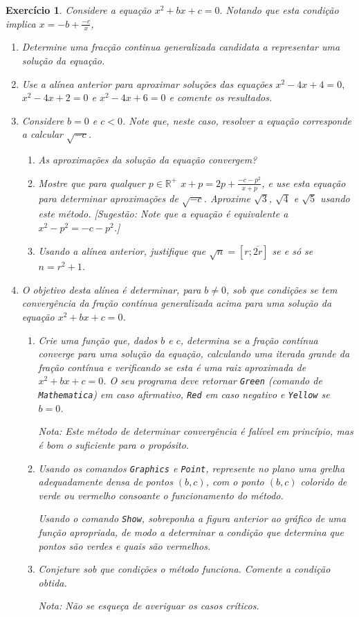 \documentclass{article}
\newtheorem{ex}{Exercício}[section]
\begin{document}
\begin{ex}
Considere a equação $x^2+bx+c=0.$ Notando que esta condição implica $x=-b+\frac{-c}{x}$,
\begin{enumerate}
    \item Determine uma fracção continua generalizada candidata a representar uma solução da equação.
    \item Use a alínea anterior para aproximar soluções das equações $x^2-4x+4=0,$ $x^2-4x+2=0$ e $x^2-4x+6=0$ e comente os resultados.
    \item Considere $b=0$ e $c<0$. Note que, neste caso, resolver a equação corresponde a calcular $\sqrt{-c}$.
    \begin{enumerate}
        \item As aproximações da solução da equação convergem?
        \item Mostre que para qualquer $p\in \mathbb{R}^+$ $x+p=2p+\frac{-c-p^2}{x+p}$, e use esta equação para determinar aproximações de $\sqrt{-c}$. Aproxime $\sqrt{3}$, $\sqrt{4}$ e $\sqrt{5}$ usando este método. [Sugestão: Note que a equação é equivalente a $x^2-p^2=-c-p^2$.]
        \item Usando a alínea anterior, justifique que $\sqrt{n}=[r;\overline{2r}]$ se e só se $n=r^2+1$.
    \end{enumerate}
    
    \item O objetivo desta alínea é determinar, para $b \neq 0$, sob que condições se tem convergência da fração contínua generalizada acima para uma solução da equação $x^2 + bx + c = 0$.
    \begin{enumerate}
    \item Crie uma função que, dados $b$ e $c$, determina se a fração contínua converge para uma solução da equação, calculando uma iterada grande da fração contínua e verificando se esta é uma raiz aproximada de $x^2 + bx +c=0$. O seu programa deve retornar \texttt{Green} (comando de \texttt{Mathematica}) em caso afirmativo, \texttt{Red} em caso negativo e \texttt{Yellow} se $b = 0$. 
    
    Nota: Este método de determinar convergência é falível em princípio, mas é bom o suficiente para o propósito.
    
    \item Usando os comandos \texttt{Graphics} e \texttt{Point}, represente no plano uma grelha adequadamente densa de pontos $(b,c)$, com o ponto $(b,c)$ colorido de verde ou vermelho consoante o funcionamento do método.
    
    Usando o comando \texttt{Show}, sobreponha a figura anterior ao gráfico de uma função apropriada, de modo a determinar a condição que determina que pontos são verdes e quais são vermelhos.
    
    \item Conjeture sob que condições o método funciona. Comente a condição obtida.
    
    Nota: Não se esqueça de averiguar os casos críticos.
    \end{enumerate}
\end{enumerate}
\end{ex}
\end{document}
